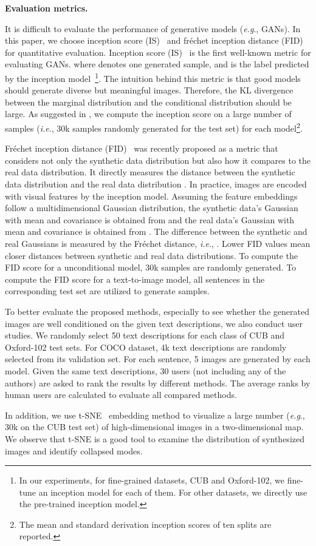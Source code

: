 \documentclass[10pt,journal,letterpaper,compsoc]{IEEEtran}
\begin{document}
\textbf{Evaluation metrics. }
{
It is difficult to evaluate the performance of generative models (\emph{e.g}., GANs). In this paper, we choose inception score (IS)~\cite{Salimans2016} and fr\'echet inception distance (FID)~\cite{HeuselRUNH17} for quantitative evaluation. Inception score (IS)~\cite{Salimans2016} is the first well-known metric for evaluating GANs.  where  denotes one generated sample, and  is the label predicted by the inception model~\cite{Szegedy2016}\footnote{In our experiments, for fine-grained datasets, CUB and Oxford-102, we fine-tune an inception model for each of them. For other datasets, we directly use the pre-trained inception model.}. The intuition behind this metric is that good models should generate diverse but meaningful images. Therefore, the KL divergence between the marginal distribution  and the conditional distribution  should be large. As suggested in \cite{Salimans2016}, we compute the inception score on a large number of samples (\emph{i.e}., 30k samples randomly generated for the test set) for each model\footnote{The mean and standard derivation inception scores of ten splits are reported.}. 


Fr\'echet inception distance (FID)~\cite{HeuselRUNH17} was recently proposed as a metric that considers not only the synthetic data distribution but also how it compares to the real data distribution. It directly measures the distance between the synthetic data distribution  and the real data distribution . In practice, images are encoded with visual features by the inception model. Assuming the feature embeddings follow a multidimensional Gaussian distribution, the synthetic data's Gaussian with mean and covariance  is obtained from  and the real data's Gaussian with mean and covariance  is obtained from . The difference between the synthetic and real Gaussians is measured by the Fr\'echet distance, \emph{i.e}., . Lower FID values mean closer distances between synthetic and real data distributions.  To compute the FID score for a unconditional model, 30k samples are randomly generated. To compute the FID score for a text-to-image model, all sentences in the corresponding test set are utilized to generate samples. 


To better evaluate the proposed methods, especially to see whether the generated images are well conditioned on the given  text descriptions, we also conduct user studies. We randomly select 50 text descriptions for each class of CUB and Oxford-102 test sets. For COCO dataset, 4k text descriptions are randomly selected from its validation set. For each sentence, 5 images are generated by each model. Given the same text descriptions, 30 users (not including any of the authors) are asked to rank the results by different methods. The average ranks by human users are calculated to evaluate all compared methods. 


In addition, we use t-SNE~\cite{t-SNE} embedding method to visualize a large number (\emph{e.g}., 30k on the CUB test set) of high-dimensional images in a two-dimensional map. We observe that t-SNE is a good tool to examine the distribution of synthesized images and identify collapsed modes. 
}
\end{document}
